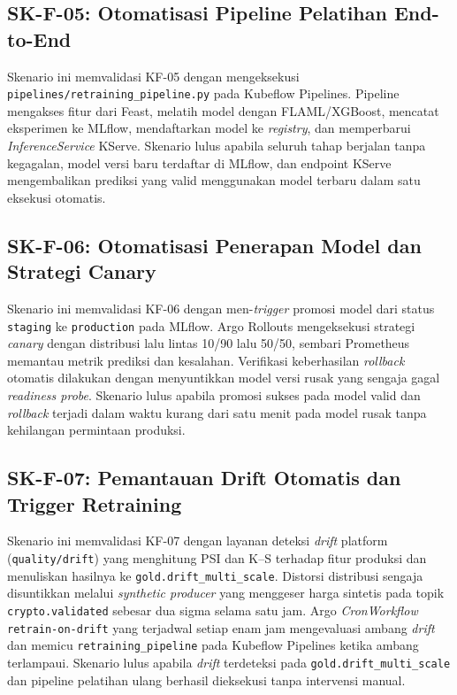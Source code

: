 \subsection{SK-F-05: Otomatisasi Pipeline Pelatihan End-to-End}

Skenario ini memvalidasi KF-05 dengan mengeksekusi \texttt{pipelines/retraining\_pipeline.py} pada Kubeflow Pipelines. Pipeline mengakses fitur dari Feast, melatih model dengan FLAML/XGBoost, mencatat eksperimen ke MLflow, mendaftarkan model ke \textit{registry}, dan memperbarui \textit{InferenceService} KServe. Skenario lulus apabila seluruh tahap berjalan tanpa kegagalan, model versi baru terdaftar di MLflow, dan endpoint KServe mengembalikan prediksi yang valid menggunakan model terbaru dalam satu eksekusi otomatis.

\subsection{SK-F-06: Otomatisasi Penerapan Model dan Strategi Canary}

Skenario ini memvalidasi KF-06 dengan men-\textit{trigger} promosi model dari status \texttt{staging} ke \texttt{production} pada MLflow. Argo Rollouts mengeksekusi strategi \textit{canary} dengan distribusi lalu lintas 10/90 lalu 50/50, sembari Prometheus memantau metrik prediksi dan kesalahan. Verifikasi keberhasilan \textit{rollback} otomatis dilakukan dengan menyuntikkan model versi rusak yang sengaja gagal \textit{readiness probe}. Skenario lulus apabila promosi sukses pada model valid dan \textit{rollback} terjadi dalam waktu kurang dari satu menit pada model rusak tanpa kehilangan permintaan produksi.

\subsection{SK-F-07: Pemantauan Drift Otomatis dan Trigger Retraining}

Skenario ini memvalidasi KF-07 dengan layanan deteksi \textit{drift} platform (\texttt{quality/drift}) yang menghitung PSI dan K--S terhadap fitur produksi dan menuliskan hasilnya ke \texttt{gold.drift\_multi\_scale}. Distorsi distribusi sengaja disuntikkan melalui \textit{synthetic producer} yang menggeser harga sintetis pada topik \texttt{crypto.validated} sebesar dua sigma selama satu jam. Argo \textit{CronWorkflow} \texttt{retrain-on-drift} yang terjadwal setiap enam jam mengevaluasi ambang \textit{drift} dan memicu \texttt{retraining\_pipeline} pada Kubeflow Pipelines ketika ambang terlampaui. Skenario lulus apabila \textit{drift} terdeteksi pada \texttt{gold.drift\_multi\_scale} dan pipeline pelatihan ulang berhasil dieksekusi tanpa intervensi manual.

